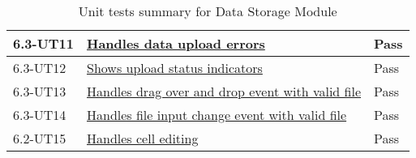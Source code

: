 \documentclass[12pt, titlepage]{article}
\begin{document}
\begin{table}[H]
\begin{tabular}{|l|l|l|}
    \hline
    6.3-UT11 & \href{https://github.com/SumanyaG/Alkalytics/blob/main/src/backend/test/migrationServiceTest.py}{Handles data upload errors} & Pass \\
    \hline
    6.3-UT12 & \href{https://github.com/SumanyaG/Alkalytics/blob/main/src/frontend/test/hooks/UploadArea.test.tsxy}{Shows upload status indicators} & Pass \\
    \hline
    6.3-UT13 & \href{https://github.com/SumanyaG/Alkalytics/blob/main/src/frontend/test/hooks/UploadArea.test.tsx}{Handles drag over and drop event with valid file} & Pass \\
    \hline
    6.3-UT14 & \href{https://github.com/SumanyaG/Alkalytics/blob/main/src/frontend/test/hooks/UploadArea.test.tsx}{Handles file input change event with valid file} & Pass \\
    \hline
    6.2-UT15 & \href{https://github.com/SumanyaG/Alkalytics/blob/main/src/frontend/test/hooks/TableBody.test.tsx}{Handles cell editing} & Pass \\
    \hline
  \end{tabular}
  \caption{Unit tests summary for Data Storage Module}
  \label{UT:DataStorage}
\end{table}


\newpage
\end{document}
